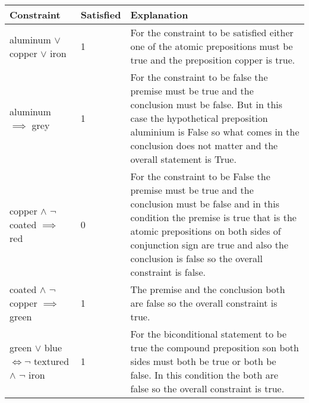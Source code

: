 \documentclass[addpoints]{exam}
\begin{document}
\begin{questions}
\begin{solution}
    \begin{tabularx}{\textwidth}{l|l|X}
      Constraint & Satisfied & Explanation \\\hline
      aluminum $\lor$ copper $\lor$ iron & 1 & For the constraint to be satisfied either one of the atomic prepositions must be true and the preposition copper is true. \\
      aluminum $\implies$ grey & 1 & For the constraint to be false the premise must be true and the conclusion must be false. But in this case the hypothetical preposition aluminium is False so what comes in the conclusion does not matter and the overall statement is True.\\
      copper $\land$ $\neg$ coated $\implies$ red & 0 & For the constraint to be False the premise must be true and the conclusion must be false and in this condition the premise is true that is the atomic prepositions on both sides of conjunction sign are true and also the conclusion is false so the overall constraint is false. \\
      coated $\land$ $\neg$ copper $\implies$ green & 1 & The premise and the conclusion both are false so the overall constraint is true.  \\
      green $\lor$ blue $\iff \neg$ textured $\land$ $\neg$ iron & 1 & For the biconditional
      statement to be true the compound preposition son both sides must both be true or both be false. In this condition the both are false so the overall constraint is true.\\
    \end{tabularx}
  \end{solution}



\end{questions}
\end{document}
